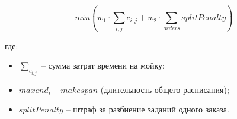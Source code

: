 \begin{equation}
    min \left(w_1 \cdot \sum_{i,j}c_{i,j} + w_2 \cdot \sum_{orders} splitPenalty \right)
    \label{eq:target_function}
\end{equation}

\noindent где:

\begin{itemize}
    \item $\sum_{c_{i,j}}$ -- сумма затрат времени на мойку;
    \item $max end_i$ -- $makespan$ (длительность общего расписания);
    \item $splitPenalty$ -- штраф за разбиение заданий одного заказа.
\end{itemize}


